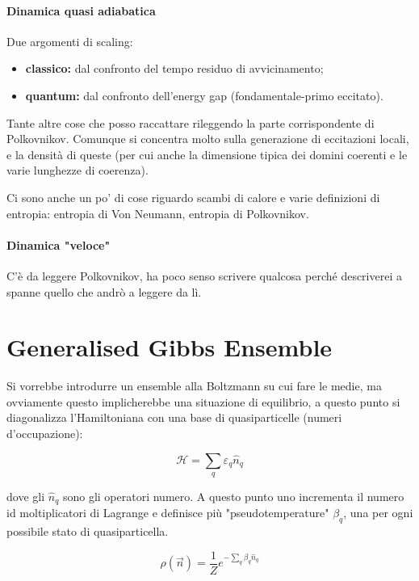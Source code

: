 \documentclass[a4paper,10pt]{article}
\begin{document}
\paragraph{Dinamica quasi adiabatica}
Due argomenti di scaling:
\begin{itemize}
	\item \textbf{classico:} dal confronto del tempo residuo di avvicinamento;
	\item \textbf{quantum:} dal confronto dell'energy gap (fondamentale-primo eccitato).
\end{itemize}

Tante altre cose che posso raccattare rileggendo la parte corrispondente di Polkovnikov.
Comunque si concentra molto sulla generazione di eccitazioni locali, e la densità di queste (per cui anche la dimensione tipica dei domini coerenti e le varie lunghezze di coerenza).

Ci sono anche un po' di cose riguardo scambi di calore e varie definizioni di entropia: entropia di Von Neumann, entropia di Polkovnikov.

\paragraph{Dinamica "veloce"} C'è da leggere Polkovnikov, ha poco senso scrivere qualcosa perché descriverei a spanne quello che andrò a leggere da lì.

\section{Generalised Gibbs Ensemble}
Si vorrebbe introdurre un ensemble alla Boltzmann su cui fare le medie, ma ovviamente questo implicherebbe una situazione di equilibrio, a questo punto si diagonalizza l'Hamiltoniana con una base di quasiparticelle (numeri d'occupazione):

\begin{equation}
\mathcal{H} = \sum_q \varepsilon_q \hat{n}_q
\end{equation}

\noindent dove gli $\hat{n}_q$ sono gli operatori numero.
A questo punto uno incrementa il numero id moltiplicatori di Lagrange e definisce più "pseudotemperature" $\beta_q$, una per ogni possibile stato di quasiparticella.

\begin{equation}
\rho(\vec{n}) = \frac{1}{Z} e^{- \sum_q \beta_q \hat{n}_q}
\end{equation}
\end{document}
